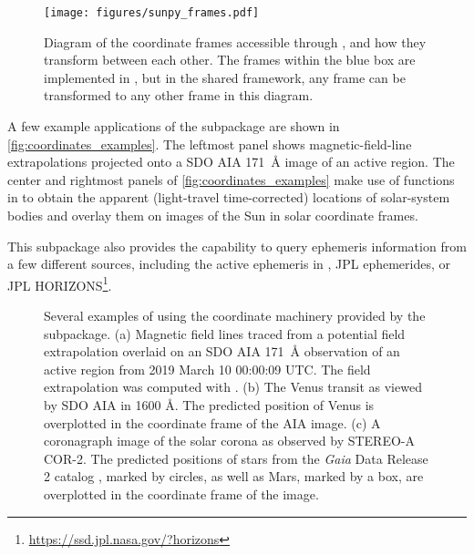 \begin{figure}
    \centering
    \texttt{[image: figures/sunpy\_frames.pdf]}
    \caption{Diagram of the coordinate frames accessible through , and how they transform between each other.
    The frames within the blue box are implemented in , but in the shared framework, any frame can be transformed to any other frame in this diagram.}
    \label{fig:transform_graph}
\end{figure}

A few example applications of the  subpackage are shown in \autoref{fig:coordinates_examples}.
The leftmost panel shows magnetic-field-line extrapolations projected onto a SDO AIA 171~\AA{} image of an active region.
The center and rightmost panels of \autoref{fig:coordinates_examples} make use of functions in  to obtain the apparent (light-travel time-corrected) locations of solar-system bodies and overlay them on images of the Sun in solar coordinate frames.

This subpackage also provides the capability to query ephemeris information from a few different sources, including the active ephemeris in , JPL ephemerides, or JPL HORIZONS\footnote{\url{https://ssd.jpl.nasa.gov/?horizons}}.

\begin{figure}
    \caption{Several examples of using the coordinate machinery provided by the  subpackage.
    (a) Magnetic field lines traced from a potential field extrapolation overlaid on an SDO AIA 171~\AA{} observation of an active region from 2019 March 10 00:00:09 UTC.
    The field extrapolation was computed with  \citep{david_stansby_2019_3237053}.
    (b) The Venus transit as viewed by SDO AIA in 1600 \AA. The predicted position of Venus is overplotted in the coordinate frame of the AIA image.
    (c) A coronagraph image of the solar corona as observed by STEREO-A COR-2. The predicted positions of stars from the \textit{Gaia} \citep{gaia_collaboration_gaia_2016} Data Release 2 catalog \citep{gaia_collaboration_gaia_2018}, marked by circles, as well as Mars, marked by a box, are overplotted in the coordinate frame of the image.}
    \label{fig:coordinates_examples}
\end{figure}
